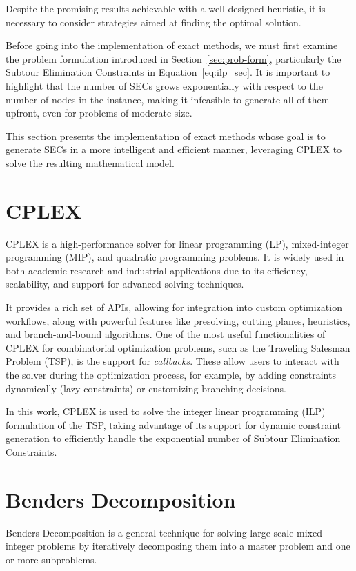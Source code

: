 Despite the promising results achievable with a well-designed heuristic, it is necessary to consider strategies aimed at finding the optimal solution.

Before going into the implementation of exact methods, we must first examine the problem formulation introduced in Section~\ref{sec:prob-form}, particularly the Subtour Elimination Constraints in Equation~\ref{eq:ilp_sec}. It is important to highlight that the number of SECs grows exponentially with respect to the number of nodes in the instance, making it infeasible to generate all of them upfront, even for problems of moderate size.

This section presents the implementation of exact methods whose goal is to generate SECs in a more intelligent and efficient manner, leveraging CPLEX to solve the resulting mathematical model.

\section{CPLEX}

CPLEX is a high-performance solver for linear programming (LP), mixed-integer programming (MIP), and quadratic programming problems. It is widely used in both academic research and industrial applications due to its efficiency, scalability, and support for advanced solving techniques.

It provides a rich set of APIs, allowing for integration into custom optimization workflows, along with powerful features like presolving, cutting planes, heuristics, and branch-and-bound algorithms. One of the most useful functionalities of CPLEX for combinatorial optimization problems, such as the Traveling Salesman Problem (TSP), is the support for \emph{callbacks}. These allow users to interact with the solver during the optimization process, for example, by adding constraints dynamically (lazy constraints) or customizing branching decisions.

In this work, CPLEX is used to solve the integer linear programming (ILP) formulation of the TSP, taking advantage of its support for dynamic constraint generation to efficiently handle the exponential number of Subtour Elimination Constraints.

\section{Benders Decomposition}

Benders Decomposition is a general technique for solving large-scale mixed-integer problems by iteratively decomposing them into a master problem and one or more subproblems. 

